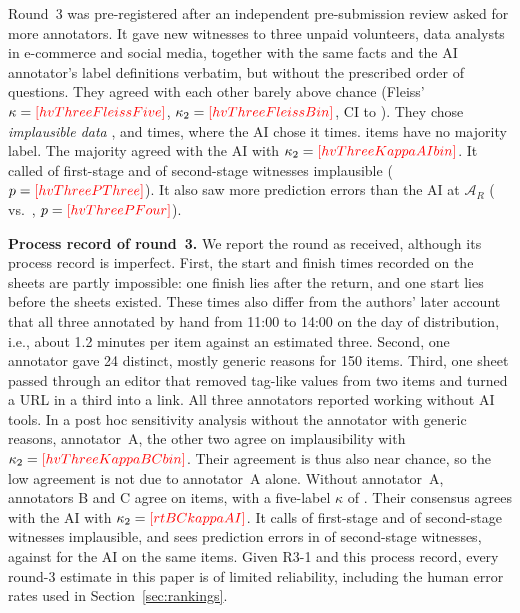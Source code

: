 Round~3 was pre-registered after an independent pre-submission review asked for more annotators. It gave  new witnesses to three unpaid volunteers, data analysts in e-commerce and social media, together with the same facts and the AI annotator's label definitions verbatim, but without the prescribed order of questions. They agreed with each other barely above chance (Fleiss' $\kappa=\V{hvThreeFleissFive}$, $\kappa_2=\V{hvThreeFleissBin}$, CI  to ). They chose \emph{implausible data} ,  and  times, where the AI chose it  times.  items have no majority label. The majority agreed with the AI with $\kappa_2=\V{hvThreeKappaAIbin}$. It called  of  first-stage and  of  second-stage witnesses implausible ($p=\V{hvThreePThree}$). It also saw more prediction errors than the AI at $\mathcal A_R$ ( vs.\ , $p=\V{hvThreePFour}$).

\textbf{Process record of round~3.} We report the round as received, although its process record is imperfect. First, the start and finish times recorded on the sheets are partly impossible: one finish lies after the return, and one start lies before the sheets existed. These times also differ from the authors' later account that all three annotated by hand from 11:00 to 14:00 on the day of distribution, i.e., about 1.2 minutes per item against an estimated three. Second, one annotator gave 24 distinct, mostly generic reasons for 150 items. Third, one sheet passed through an editor that removed tag-like values from two items and turned a URL in a third into a link. All three annotators reported working without AI tools. In a post hoc sensitivity analysis without the annotator with generic reasons, annotator~A, the other two agree on implausibility with $\kappa_2=\V{hvThreeKappaBCbin}$. Their agreement is thus also near chance, so the low agreement is not due to annotator~A alone. Without annotator~A, annotators B and C agree on  items, with a five-label $\kappa$ of . Their consensus agrees with the AI with $\kappa_2=\V{rtBCkappaAI}$. It calls  of  first-stage and  of  second-stage witnesses implausible, and sees prediction errors in  of  second-stage witnesses, against  for the AI on the same items. Given R3-1 and this process record, every round-3 estimate in this paper is of limited reliability, including the human error rates used in Section~\ref{sec:rankings}.

